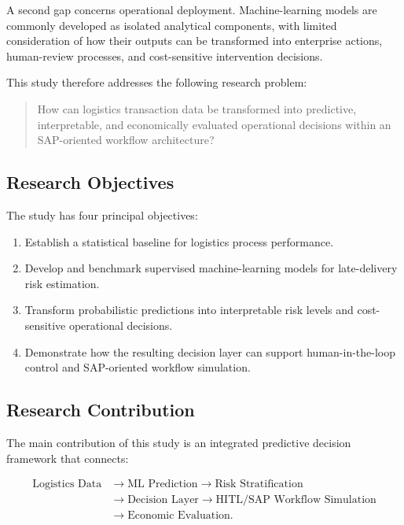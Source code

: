 \documentclass[11pt,a4paper]{article}
\begin{document}
A second gap concerns operational deployment. Machine-learning models are commonly developed as isolated analytical components, with limited consideration of how their outputs can be transformed into enterprise actions, human-review processes, and cost-sensitive intervention decisions.

This study therefore addresses the following research problem:

\begin{quote}
How can logistics transaction data be transformed into predictive, interpretable, and economically evaluated operational decisions within an SAP-oriented workflow architecture?
\end{quote}

\subsection{Research Objectives}

The study has four principal objectives:

\begin{enumerate}
    \item Establish a statistical baseline for logistics process performance.
    \item Develop and benchmark supervised machine-learning models for late-delivery risk estimation.
    \item Transform probabilistic predictions into interpretable risk levels and cost-sensitive operational decisions.
    \item Demonstrate how the resulting decision layer can support human-in-the-loop control and SAP-oriented workflow simulation.
\end{enumerate}

\subsection{Research Contribution}

The main contribution of this study is an integrated predictive decision framework that connects:

\[
\begin{aligned}
\text{Logistics Data}
&\rightarrow \text{ML Prediction}
\rightarrow \text{Risk Stratification}\\
&\rightarrow \text{Decision Layer}
\rightarrow \text{HITL/SAP Workflow Simulation}\\
&\rightarrow \text{Economic Evaluation}.
\end{aligned}
\]
\end{document}
